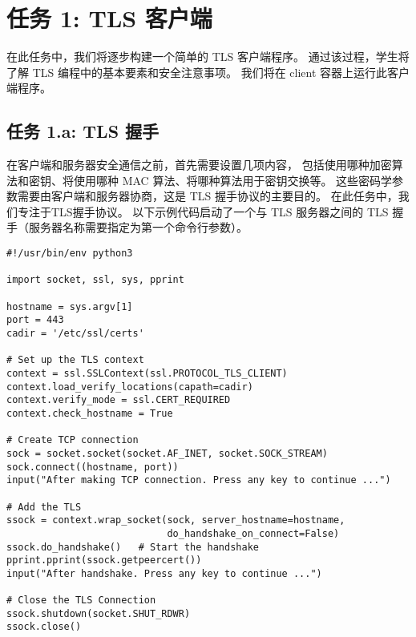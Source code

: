 \section{任务 1: TLS 客户端}


在此任务中，我们将逐步构建一个简单的 TLS 客户端程序。
通过该过程，学生将了解 TLS 编程中的基本要素和安全注意事项。
我们将在 client 容器上运行此客户端程序。

\subsection{任务 1.a: TLS 握手}


在客户端和服务器安全通信之前，首先需要设置几项内容，
包括使用哪种加密算法和密钥、将使用哪种 MAC 算法、将哪种算法用于密钥交换等。
这些密码学参数需要由客户端和服务器协商，这是 TLS 握手协议的主要目的。
在此任务中，我们专注于TLS握手协议。
以下示例代码启动了一个与 TLS 服务器之间的 TLS 握手（服务器名称需要指定为第一个命令行参数）。


\begin{lstlisting}[caption={\texttt{handshake.py} (in \texttt{Labsetup/volumes})}, label={tls:handshake}]
#!/usr/bin/env python3

import socket, ssl, sys, pprint

hostname = sys.argv[1]
port = 443
cadir = '/etc/ssl/certs'

# Set up the TLS context
context = ssl.SSLContext(ssl.PROTOCOL_TLS_CLIENT)
context.load_verify_locations(capath=cadir)
context.verify_mode = ssl.CERT_REQUIRED
context.check_hostname = True

# Create TCP connection
sock = socket.socket(socket.AF_INET, socket.SOCK_STREAM)
sock.connect((hostname, port))
input("After making TCP connection. Press any key to continue ...")

# Add the TLS
ssock = context.wrap_socket(sock, server_hostname=hostname,
                            do_handshake_on_connect=False)
ssock.do_handshake()   # Start the handshake
pprint.pprint(ssock.getpeercert())
input("After handshake. Press any key to continue ...")

# Close the TLS Connection
ssock.shutdown(socket.SHUT_RDWR)
ssock.close()
\end{lstlisting}




